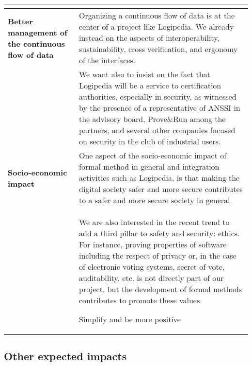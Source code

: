 \begin{longtable}{|p{}|p{}|}
\begin{framed}
\begin{compactitem}
\end{compactitem}


\end{framed}\\
\hline
    {\bf Better management of the continuous flow of data}
    &
Organizing a continuous flow of data is at the center of a project
like Logipedia. We already instead on the aspects of interoperability,
sustainability, cross verification, and ergonomy of the interfaces.\\

&
\hspace{0.4cm}
We want also to insist on the fact that Logipedia will be a service to
certification authorities, especially in security, as witnessed by the
presence of a representative of ANSSI in the advisory board,
Prove\&Run among the partners, and several other companies focused on
security in the club of industrial users.\\
\hline
{\bf Socio-economic impact}
&
One aspect of the socio-economic impact of formal method in general
and integration activities such as Logipedia, is that making the 
digital society safer and more secure contributes to a safer and more 
secure society in general.\\

&
\hspace{0.4cm} We are also interested in the recent trend to add a
third pillar to safety and security: ethics. For instance, proving
properties of software including the respect of privacy or, in the
case of electronic voting systems, secret of vote, auditability, etc.
is not directly part of our project, but the development of formal
methods contributes to promote these values.

{\color{red} Simplify and be more positive}\\

\hline
\end{longtable}


\subsection*{Other expected impacts}


